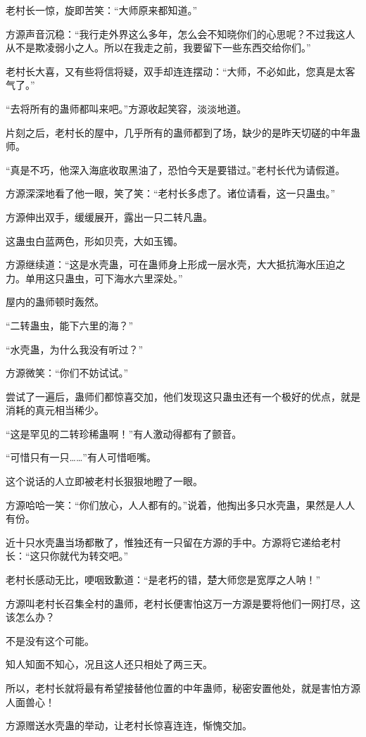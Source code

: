 \begin{this_body}
老村长一惊，旋即苦笑：“大师原来都知道。”

方源声音沉稳：“我行走外界这么多年，怎么会不知晓你们的心思呢？不过我这人从不是欺凌弱小之人。所以在我走之前，我要留下一些东西交给你们。”

老村长大喜，又有些将信将疑，双手却连连摆动：“大师，不必如此，您真是太客气了。”

“去将所有的蛊师都叫来吧。”方源收起笑容，淡淡地道。

片刻之后，老村长的屋中，几乎所有的蛊师都到了场，缺少的是昨天切磋的中年蛊师。

“真是不巧，他深入海底收取黑油了，恐怕今天是要错过。”老村长代为请假道。

方源深深地看了他一眼，笑了笑：“老村长多虑了。诸位请看，这一只蛊虫。”

方源伸出双手，缓缓展开，露出一只二转凡蛊。

这蛊虫白蓝两色，形如贝壳，大如玉镯。

方源继续道：“这是水壳蛊，可在蛊师身上形成一层水壳，大大抵抗海水压迫之力。单用这只蛊虫，可下海水六里深处。”

屋内的蛊师顿时轰然。

“二转蛊虫，能下六里的海？”

“水壳蛊，为什么我没有听过？”

方源微笑：“你们不妨试试。”

尝试了一遍后，蛊师们都惊喜交加，他们发现这只蛊虫还有一个极好的优点，就是消耗的真元相当稀少。

“这是罕见的二转珍稀蛊啊！”有人激动得都有了颤音。

“可惜只有一只……”有人可惜咂嘴。

这个说话的人立即被老村长狠狠地瞪了一眼。

方源哈哈一笑：“你们放心，人人都有的。”说着，他掏出多只水壳蛊，果然是人人有份。

近十只水壳蛊当场都散了，惟独还有一只留在方源的手中。方源将它递给老村长：“这只你就代为转交吧。”

老村长感动无比，哽咽致歉道：“是老朽的错，楚大师您是宽厚之人呐！”

方源叫老村长召集全村的蛊师，老村长便害怕这万一方源是要将他们一网打尽，这该怎么办？

不是没有这个可能。

知人知面不知心，况且这人还只相处了两三天。

所以，老村长就将最有希望接替他位置的中年蛊师，秘密安置他处，就是害怕方源人面兽心！

方源赠送水壳蛊的举动，让老村长惊喜连连，惭愧交加。


\end{this_body}
